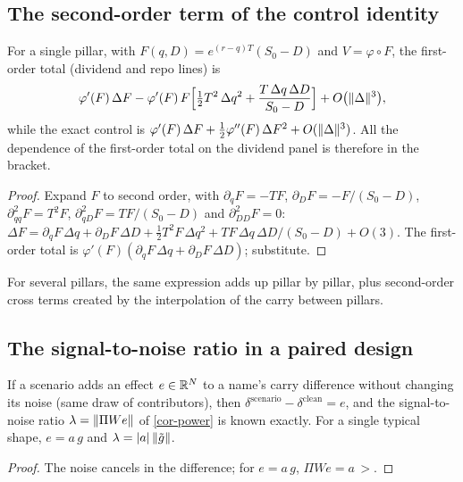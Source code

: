 \subsection{The second-order term of the control identity}\label{app-second}
\begin{proposition}\label{prop-second}
For a single pillar, with $F(q, D)=e^{(r-q)T}(S_0-D)$ and $V=\varphi\circ F$, the first-order total (dividend and repo
lines) is
\[
\varphi'(F)\,\Delta F-\varphi'(F)\,F\Bigl[\tfrac12T^2\,\Delta q^2+\frac{T\,\Delta q\,\Delta D}{S_0-D}\Bigr]
+O\bigl(\lVert \Delta\rVert^3\bigr),
\]
while the exact control is $\varphi'(F)\,\Delta F+\frac12\varphi''(F)\,\Delta F^2+O(\lVert \Delta\rVert^3)$. All the dependence
of the first-order total on the dividend panel is therefore in the bracket.
\end{proposition}
\begin{proof}
Expand $F$ to second order, with $\partial_qF=-TF$, $\partial_DF=-F/(S_0-D)$, $\partial^2_{qq}F=T^2F$,
$\partial^2_{qD}F=TF/(S_0-D)$ and $\partial^2_{DD}F=0$:
$\Delta F=\partial_qF\,\Delta q+\partial_DF\,\Delta D+\frac12T^2F\,\Delta q^2+TF\,\Delta q\,\Delta D/(S_0-D)+O(3)$. The
first-order total is $\varphi'(F)(\partial_qF\,\Delta q+\partial_DF\,\Delta D)$; substitute.
\end{proof}
For several pillars, the same expression adds up pillar by pillar, plus second-order cross terms created by the
interpolation of the carry between pillars.

\subsection{The signal-to-noise ratio in a paired design}
\begin{lemma}
If a scenario adds an effect $e\in\mathbb{R}^N$ to a name's carry difference without changing its noise (same draw of
contributors), then $\delta^{\text{scenario}}-\delta^{\text{clean}}=e$, and the signal-to-noise ratio
$\lambda=\lVert \Pi We\rVert$ of \cref{cor-power} is known exactly. For a single typical shape, $e=a\,g$ and
$\lambda=|a|\,\lVert \tilde g\rVert$.
\end{lemma}
\begin{proof}
The noise cancels in the difference; for $e=a\,g$, $\Pi We=a\,\gt$.
\end{proof}

